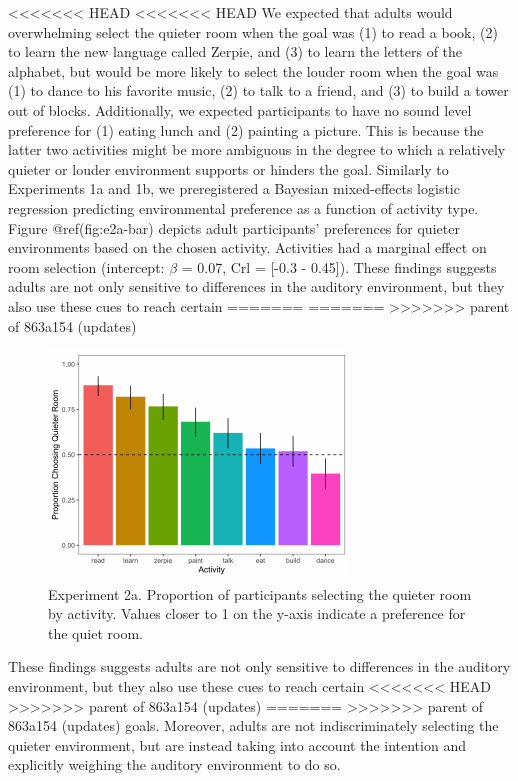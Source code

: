 \documentclass[10pt, letterpaper]{article}
\newenvironment{CodeChunk}{}{}
\begin{document}
<<<<<<< HEAD
<<<<<<< HEAD
We expected that adults would overwhelming select the quieter room when
the goal was (1) to read a book, (2) to learn the new language called
Zerpie, and (3) to learn the letters of the alphabet, but would be more
likely to select the louder room when the goal was (1) to dance to his
favorite music, (2) to talk to a friend, and (3) to build a tower out of
blocks. Additionally, we expected participants to have no sound level
preference for (1) eating lunch and (2) painting a picture. This is
because the latter two activities might be more ambiguous in the degree
to which a relatively quieter or louder environment supports or hinders
the goal. Similarly to Experiments 1a and 1b, we preregistered a
Bayesian mixed-effects logistic regression predicting environmental
preference as a function of activity type. Figure @ref(fig:e2a-bar)
depicts adult participants' preferences for quieter environments based
on the chosen activity. Activities had a marginal effect on room
selection (intercept: \(\beta\) = 0.07, Crl = {[}-0.3 - 0.45{]}). These
findings suggests adults are not only sensitive to differences in the
auditory environment, but they also use these cues to reach certain
=======
=======
>>>>>>> parent of 863a154 (updates)
\begin{CodeChunk}
\begin{figure}[H]

{\centering \includegraphics{figs/image 5-1} 

}

\caption[Experiment 2a]{Experiment 2a. Proportion of participants selecting the quieter room by activity. Values closer to 1 on the y-axis indicate a preference for the quiet room.}\label{fig:image 5}
\end{figure}
\end{CodeChunk}

These findings suggests adults are not only sensitive to differences in
the auditory environment, but they also use these cues to reach certain
<<<<<<< HEAD
>>>>>>> parent of 863a154 (updates)
=======
>>>>>>> parent of 863a154 (updates)
goals. Moreover, adults are not indiscriminately selecting the quieter
environment, but are instead taking into account the intention and
explicitly weighing the auditory environment to do so.
\end{document}
